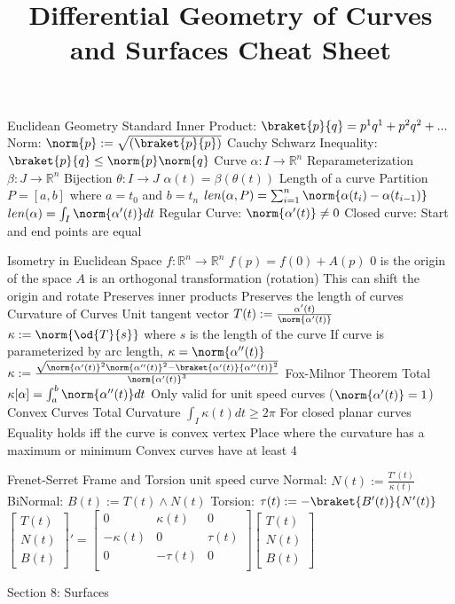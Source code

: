 \documentclass[14pt]{extarticle}
\title{Differential Geometry of Curves and Surfaces Cheat Sheet}
\begin{document}
	\maketitle
	\begin{outline}
		\1	Euclidean Geometry
			\2	Standard Inner Product: $\braket{p}{q} = p^1q^1 + p^2q^2 + ... $
			\2	Norm: $\norm{p} := \sqrt{(\braket{p}{p})}$
			\2	Cauchy Schwarz Inequality: $\braket{p}{q} \le \norm{p}\norm{q}$
		\1	Curve
			\2	$\alpha : I \rightarrow \mathbb{R}^n$
			\2	Reparameterization
				\3	$\beta : J \rightarrow \mathbb{R}^n$
				\3	Bijection $\theta : I \rightarrow J$
				\3	$\alpha(t) = \beta(\theta(t))$
			\2	Length of a curve
				\3	Partition $P = [a,b]$ where $a = t_0$ and $b = t_n$ 
				\3	$len(\alpha,P) = \sum_{i=1}^n \norm{\alpha(t_i) - \alpha(t_{i-1})}$
				\3	$len(\alpha) = \int_{I}\norm{\alpha'(t)}dt$
			\2	Regular Curve: $\norm{\alpha'(t)} \ne 0$
			\2	Closed curve:	Start and end points are equal

		\1	Isometry in Euclidean Space
			\2	$f : \mathbb{R}^n \rightarrow \mathbb{R}^n$
			\2	$f(p) = f(0) + A(p)$
				\3	$0$ is the origin of the space
				\3	$A$ is an orthogonal transformation (rotation)
				\3	This can shift the origin and rotate 
			\2	Preserves inner products
			\2	Preserves the length of curves
		\1	Curvature of Curves
			\2	Unit tangent vector $T(t) := \frac{\alpha'(t)}{\norm{\alpha'(t)}}$
			\2	$\kappa := \norm{\od{T}{s}}$ where $s$ is the length of the curve
			\2	If curve is parameterized by arc length, $\kappa = \norm{\alpha''(t)}$
			\2	$\kappa := \frac{\sqrt{\norm{\alpha'(t)}^2\norm{\alpha''(t)}^2 - 
											\braket{\alpha'(t)}{\alpha''(t)}^2  }}{\norm{\alpha'(t)}^3 }$
			\2	Fox-Milnor Theorem
				\3	Total $\kappa[\alpha] = \int_a^b \norm{\alpha''(t)}dt$
				\3	Only valid for unit speed curves ($\norm{\alpha'(t)} = 1$)
		\1	Convex Curves
			\2	Total Curvature $\int_I \kappa(t) dt \ge 2\pi$
			\2	For closed planar curves
			\2	Equality holds iff the curve is convex
			\2	vertex
				\3	Place where the curvature has a maximum or minimum
				\3	Convex curves have at least 4

		\1	Frenet-Serret Frame and Torsion
			\2	unit speed curve
			\2	Normal: $N(t) := \frac{T'(t)}{\kappa(t)}$
			\2	BiNormal: $B(t) := T(t) \wedge N(t)$	
			\2	Torsion: $\tau(t) := -\braket{B'(t)}{N'(t)}$
			\2	$\begin{bmatrix}
						T(t) \\ N(t) \\ B(t)
					\end{bmatrix}' = 
					\begin{bmatrix}
						0 & \kappa(t) & 0 \\
						-\kappa(t) & 0 & \tau(t) \\
						0 & -\tau(t) & 0 \\
					\end{bmatrix}
					\begin{bmatrix}
						T(t) \\ N(t) \\ B(t)
					\end{bmatrix}$
		
		\1	Section 8: Surfaces
	\end{outline}
\end{document}
